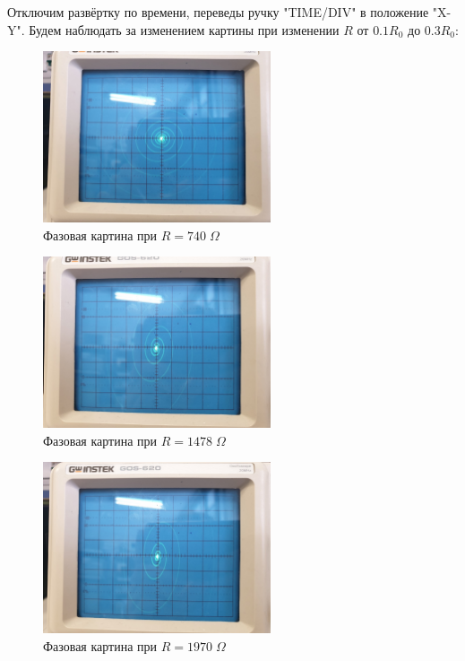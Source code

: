 \documentclass{article}
\begin{document}
Отключим развёртку по времени, переведы ручку "TIME/DIV" в положение "X-Y".
Будем наблюдать за изменением картины при изменении \( R \) от \(0.1R_0\) до \(0.3R_0\):

\begin{figure}[H]
    \centering
    \includegraphics[width = 0.6\textwidth]{XY-740.jpg}
    \caption{Фазовая картина при \(R = 740\; \Omega \)}
    \label{fig:XY_time}
\end{figure}
\begin{figure}[H]
    \centering
    \includegraphics[width = 0.6\textwidth]{XY-1478.jpg}
    \caption{Фазовая картина при \(R = 1478\; \Omega \)}
    \label{fig:XY_time}
\end{figure}
\begin{figure}[H]
    \centering
    \includegraphics[width = 0.6\textwidth]{XY-1970.jpg}
    \caption{Фазовая картина при \(R = 1970\; \Omega \)}
    \label{fig:XY_time}
\end{figure}
\end{document}
